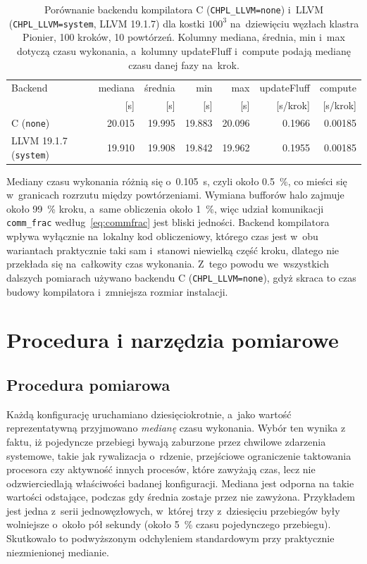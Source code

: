 \begin{table}[htbp]
\centering
\caption{Porównanie backendu kompilatora C (\texttt{CHPL\_LLVM=none}) i~LLVM
(\texttt{CHPL\_LLVM=system}, LLVM 19.1.7) dla kostki $100^3$ na~dziewięciu węzłach klastra
Pionier, \num{100} kroków, \num{10} powtórzeń. Kolumny mediana, średnia, min i~max dotyczą
czasu wykonania, a~kolumny updateFluff i~compute podają medianę czasu danej fazy na~krok.}
\label{tab:llvm}
\small
\begin{tabular}{@{}lrrrrrr@{}}
\toprule
Backend & mediana & średnia & min & max & updateFluff & compute \\
        & [s] & [s] & [s] & [s] & [s/krok] & [s/krok] \\
\midrule
C (\texttt{none}) & \num{20.015} & \num{19.995} & \num{19.883} & \num{20.096} & \num{0.1966} & \num{0.00185} \\
LLVM 19.1.7 (\texttt{system})       & \num{19.910} & \num{19.908} & \num{19.842} & \num{19.962} & \num{0.1955} & \num{0.00185} \\
\bottomrule
\end{tabular}
\end{table}

Mediany czasu wykonania różnią się o~\SI{0.105}{\second}, czyli około \SI{0.5}{\percent}, co
mieści się w~granicach rozrzutu między powtórzeniami. Wymiana bufforów halo zajmuje około \SI{99}{\percent} kroku, a~same obliczenia około
\SI{1}{\percent}, więc udział komunikacji \texttt{comm\_frac} według~\eqref{eq:commfrac} jest
bliski jedności. Backend kompilatora wpływa wyłącznie na~lokalny kod obliczeniowy, którego czas
jest w~obu wariantach praktycznie taki sam i~stanowi niewielką część kroku, dlatego nie przekłada
się na~całkowity czas wykonania.
Z~tego powodu we~wszystkich dalszych pomiarach używano backendu C (\texttt{CHPL\_LLVM=none}), gdyż skraca to czas budowy kompilatora i~zmniejsza rozmiar instalacji.

\section{Procedura i narzędzia pomiarowe}
\label{sec:procedura}

\subsection{Procedura pomiarowa}

Każdą konfigurację uruchamiano dziesięciokrotnie, a~jako wartość reprezentatywną przyjmowano \emph{medianę} czasu wykonania. Wybór ten wynika z faktu, iż
pojedyncze przebiegi bywają zaburzone przez chwilowe zdarzenia systemowe, takie jak rywalizacja o~rdzenie,
przejściowe ograniczenie taktowania procesora czy aktywność innych procesów, które zawyżają
czas, lecz nie odzwierciedlają właściwości badanej konfiguracji. Mediana jest odporna na takie
wartości odstające, podczas gdy średnia zostaje przez nie zawyżona. Przykładem jest jedna
z~serii jednowęzłowych, w~której trzy z~dziesięciu przebiegów były wolniejsze o~około pół
sekundy (około \SI{5}{\percent} czasu pojedynczego przebiegu). Skutkowało to podwyższonym odchyleniem
standardowym przy praktycznie niezmienionej medianie.

